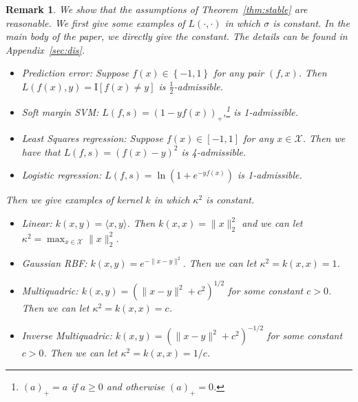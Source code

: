 \documentclass[11pt]{article}
\newtheorem{remark}[theorem]{Remark}
\newcommand{\I}{\mathrm{I}}
\newcommand{\calX}{\mathcal{X}}
\begin{document}
	\begin{remark}
		\label{remark:assumption}
		We show that the assumptions of Theorem~\ref{thm:stable} are reasonable.
		We first give some examples of $L(\cdot,\cdot)$ in which $\sigma$ is constant. 
		In the main body of the paper, we directly give the constant. 
		The details can be found in Appendix~\ref{sec:dis}.
		\begin{itemize}
		\item Prediction error: Suppose $f(x)\in \left\{-1,1\right\}$ for any pair $(f,x)$. Then $L(f(x),y) = \I\left[f(x)\neq y\right] $ is $\frac{1}{2}$-admissible.
		\item Soft margin SVM: $L(f,s) = (1-yf(x))_+$,\footnote{$(a)_+ = a$ if $a\geq 0$ and otherwise $(a)_+ = 0$.} is 1-admissible.
		\item Least Squares regression: Suppose $f(x)\in [-1,1]$ for any $x\in \calX$. 
		Then we have that $L(f,s) = (f(x)-y)^2$ is 4-admissible.
		\item Logistic regression: $L(f,s) = \ln (1+e^{-y f(x)})$ is 1-admissible.
		\end{itemize}
		\noindent
		Then we give examples of kernel $k$ in which $\kappa^2$ is constant.
		\begin{itemize}
		\item Linear: $k(x,y) = \langle x,y \rangle$. Then $k(x,x)=\|x\|_2^2$ and we can let $\kappa^2 = \max_{x\in \calX}\|x\|_2^2$.
		\item Gaussian RBF: $k(x,y)=e^{-\|x-y\|^2}$. Then we can let $\kappa^2=k(x,x)=1$.
		\item Multiquadric: $k(x,y)=\left(\|x-y\|^2+c^2\right)^{1/2}$ for some constant $c>0$. Then we can let $\kappa^2=k(x,x)=c$.
		\item Inverse Multiquadric: $k(x,y)=\left(\|x-y\|^2+c^2\right)^{-1/2}$ for some constant $c>0$. Then we can let $\kappa^2=k(x,x)=1/c$.
		\end{itemize}
	\end{remark}
	
\end{document}
